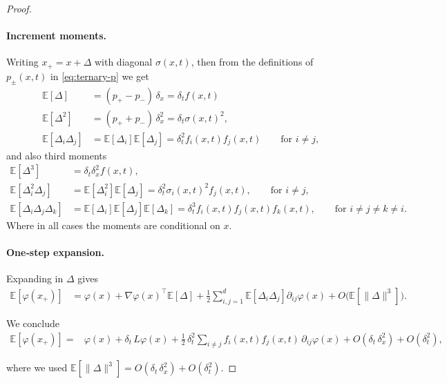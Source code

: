 \documentclass[pra,showpacs,amsmath,amssymb,amsfonts,lengthcheck,longbibliography,onecolumn]{revtex4-2}
\newcommand{\E}{\mathbb{E}}
\newcommand{\Tr}{\text{Tr}}
\begin{document}
\begin{proof}
\paragraph{Increment moments.}
Writing $x_{+}=x+\Delta$ with diagonal $\sigma(x, t)$, then from the definitions of $p_\pm(x,t)$ in \eqref{eq:ternary-p} we get
\begin{align*}
  \E[\Delta]
  &= (p_{+}-p_{-})\,\delta_x
   = \delta_t f(x,t)\\
  \E[\Delta^2]
  &= (p_{+}+p_{-})\,\delta_{x}^2
   = \delta_t \sigma(x, t)^2,\\
   \E[\Delta_i \Delta_j] &= \E[\Delta_i] \E[\Delta_j] = \delta_t^2 f_i(x,t)f_j(x,t) \qquad \text{for $i\neq j$,}
\end{align*}
and also third moments
\begin{align*}
   \E[\Delta^3]
   &= \delta_t \delta_x^{2} f(x,t),\\
   \E[\Delta^2_i \Delta_j] &= \E[\Delta^2_i] \E[\Delta_j] = \delta_t^2 \sigma_i(x, t)^2 f_j(x,t),  \qquad \text{for $i\neq j$,} \\
   \E[\Delta_i \Delta_j \Delta_k] &= \E[\Delta_i] \E[\Delta_j] \E[\Delta_k] = \delta_t^3 f_i(x,t)f_j(x,t)f_k(x,t), \qquad \text{for $i\neq j \neq k \neq i$.}
\end{align*}
Where in all cases the moments are conditional on $x$.


\paragraph{One‐step expansion.}
Expanding in $\Delta$ gives
\begin{align*}
  \E[\varphi(x_{+})]
  &= \varphi(x)
  + \nabla\varphi(x)^\top \E[\Delta]
  + \frac12 \sum_{i,j=1}^d  \E[\Delta_i \Delta_j]\partial_{ij}\varphi(x)
  + O\bigl(\E[\|\Delta\|^3]\bigr).
\end{align*}

We conclude
\begin{align*}
  \E[\varphi(x_{+})]
  =& \varphi(x)
  + \delta_t\,L\varphi(x)
  + \frac12 \, \delta_t^2 \sum_{i\neq j} f_i(x,t) f_j(x,t) \,\partial_{ij}\varphi(x)
    +O(\delta_t\,\delta_x^2) + O(\delta_t^2),
\end{align*}


where we used \(\E[\|\Delta\|^3]=O(\delta_t\,\delta_x^2) + O(\delta_t^2)\).


\end{proof}
\end{document}
